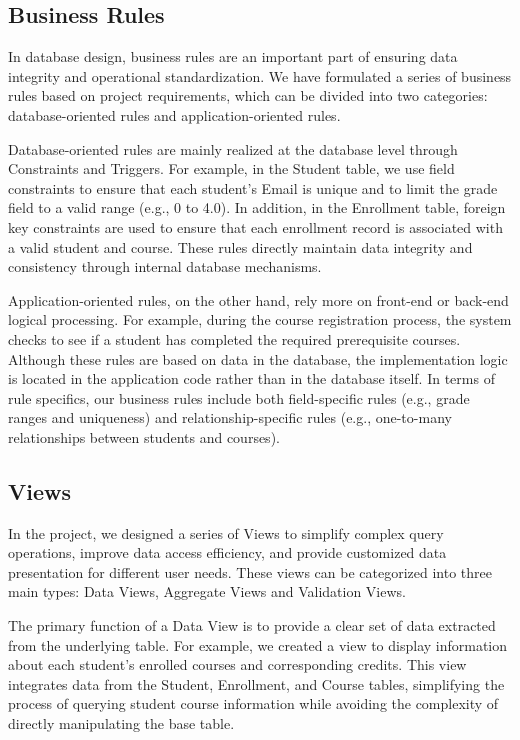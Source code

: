 \documentclass[12pt]{article}
\begin{document}
\subsection{Business Rules}
In database design, business rules are an important part of ensuring data integrity and operational standardization. We have formulated a series of business rules based on project requirements, which can be divided into two categories: database-oriented rules and application-oriented rules.

Database-oriented rules are mainly realized at the database level through Constraints and Triggers. For example, in the Student table, we use field constraints to ensure that each student's Email is unique and to limit the grade field to a valid range (e.g., 0 to 4.0). In addition, in the Enrollment table, foreign key constraints are used to ensure that each enrollment record is associated with a valid student and course. These rules directly maintain data integrity and consistency through internal database mechanisms.

Application-oriented rules, on the other hand, rely more on front-end or back-end logical processing. For example, during the course registration process, the system checks to see if a student has completed the required prerequisite courses. Although these rules are based on data in the database, the implementation logic is located in the application code rather than in the database itself. In terms of rule specifics, our business rules include both field-specific rules (e.g., grade ranges and uniqueness) and relationship-specific rules (e.g., one-to-many relationships between students and courses).

\subsection{Views}
In the project, we designed a series of Views to simplify complex query operations, improve data access efficiency, and provide customized data presentation for different user needs. These views can be categorized into three main types: Data Views, Aggregate Views and Validation Views.

The primary function of a Data View is to provide a clear set of data extracted from the underlying table. For example, we created a view to display information about each student's enrolled courses and corresponding credits. This view integrates data from the Student, Enrollment, and Course tables, simplifying the process of querying student course information while avoiding the complexity of directly manipulating the base table.
\end{document}
